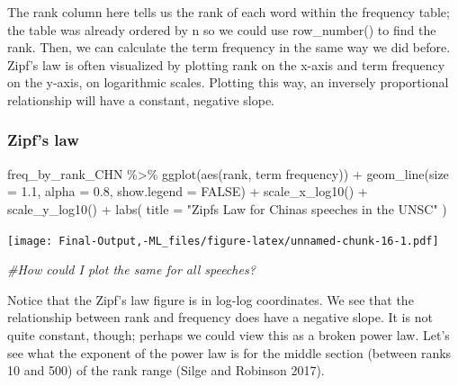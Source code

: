 \documentclass[
]{article}
\newenvironment{Shaded}{\begin{snugshade}}{\end{snugshade}}
\newcommand{\AttributeTok}[1]{\textcolor[rgb]{0.77,0.63,0.00}{#1}}
\newcommand{\CommentTok}[1]{\textcolor[rgb]{0.56,0.35,0.01}{\textit{#1}}}
\newcommand{\ConstantTok}[1]{\textcolor[rgb]{0.00,0.00,0.00}{#1}}
\newcommand{\FloatTok}[1]{\textcolor[rgb]{0.00,0.00,0.81}{#1}}
\newcommand{\FunctionTok}[1]{\textcolor[rgb]{0.00,0.00,0.00}{#1}}
\newcommand{\NormalTok}[1]{#1}
\newcommand{\SpecialCharTok}[1]{\textcolor[rgb]{0.00,0.00,0.00}{#1}}
\newcommand{\StringTok}[1]{\textcolor[rgb]{0.31,0.60,0.02}{#1}}
\begin{document}
The rank column here tells us the rank of each word within the frequency
table; the table was already ordered by n so we could use row\_number()
to find the rank. Then, we can calculate the term frequency in the same
way we did before. Zipf's law is often visualized by plotting rank on
the x-axis and term frequency on the y-axis, on logarithmic scales.
Plotting this way, an inversely proportional relationship will have a
constant, negative slope.

\hypertarget{zipfs-law}{%
\subsubsection{Zipf's law}\label{zipfs-law}}

\begin{Shaded}
\begin{Highlighting}[]
\NormalTok{freq\_by\_rank\_CHN }\SpecialCharTok{\%\textgreater{}\%} 
  \FunctionTok{ggplot}\NormalTok{(}\FunctionTok{aes}\NormalTok{(rank, }\StringTok{\textasciigrave{}}\AttributeTok{term frequency}\StringTok{\textasciigrave{}}\NormalTok{)) }\SpecialCharTok{+} 
  \FunctionTok{geom\_line}\NormalTok{(}\AttributeTok{size =} \FloatTok{1.1}\NormalTok{, }\AttributeTok{alpha =} \FloatTok{0.8}\NormalTok{, }\AttributeTok{show.legend =} \ConstantTok{FALSE}\NormalTok{) }\SpecialCharTok{+} 
  \FunctionTok{scale\_x\_log10}\NormalTok{() }\SpecialCharTok{+}
  \FunctionTok{scale\_y\_log10}\NormalTok{() }\SpecialCharTok{+}
    \FunctionTok{labs}\NormalTok{(}
        \AttributeTok{title =} \StringTok{"Zipf\textquotesingle{}s Law for China\textquotesingle{}s speeches in the UNSC"}
\NormalTok{    )}
\end{Highlighting}
\end{Shaded}

\texttt{[image: Final-Output,-ML\_files/figure-latex/unnamed-chunk-16-1.pdf]}

\begin{Shaded}
\begin{Highlighting}[]
\CommentTok{\#How could I plot the same for all speeches?}
\end{Highlighting}
\end{Shaded}

Notice that the Zipf's law figure is in log-log coordinates. We see that
the relationship between rank and frequency does have a negative slope.
It is not quite constant, though; perhaps we could view this as a broken
power law. Let's see what the exponent of the power law is for the
middle section (between ranks 10 and 500) of the rank range (Silge and
Robinson 2017).
\end{document}
